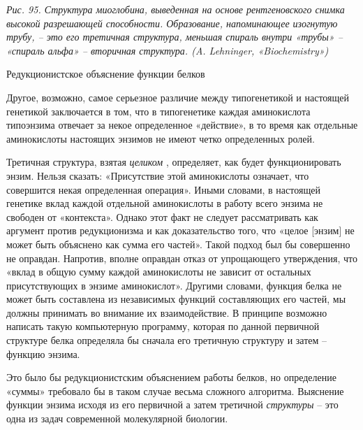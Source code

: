 \documentclass[../main.tex]{subfiles}
\begin{document}
\emph{Рис. 95. Структура миоглобина, выведенная на основе рентгеновского снимка высокой разрешающей способности. Образование, напоминающее изогнутую трубу, \--- это его третичная структура, меньшая спираль внутри «трубы» \--- «спираль альфа» \--- вторичная структура. (A. Lehninger, «Biochemistry»)}

Редукционистское объяснение функции белков

Другое, возможно, самое серьезное различие между типогенетикой и настоящей генетикой заключается в том, что в типогенетике каждая аминокислота типоэнзима отвечает за некое определенное «действие», в то время как отдельные аминокислоты настоящих энзимов не имеют четко определенных ролей.

Третичная структура, взятая \emph{целиком} , определяет, как будет функционировать энзим. Нельзя сказать: «Присутствие этой аминокислоты означает, что совершится некая определенная операция». Иными словами, в настоящей генетике вклад каждой отдельной аминокислоты в работу всего энзима не свободен от «контекста». Однако этот факт не следует рассматривать как аргумент против редукционизма и как доказательство того, что «целое {[}энзим{]} не может быть объяснено как сумма его частей». Такой подход был бы совершенно не оправдан. Напротив, вполне оправдан отказ от упрощающего утверждения, что «вклад в общую сумму каждой аминокислоты не зависит от остальных присутствующих в энзиме аминокислот». Другими словами, функция белка не может быть составлена из независимых функций составляющих его частей, мы должны принимать во внимание их взаимодействие. В принципе возможно написать такую компьютерную программу, которая по данной первичной структуре белка определяла бы сначала его третичную структуру и затем \--- функцию энзима.

Это было бы редукционистским объяснением работы белков, но определение «суммы» требовало бы в таком случае весьма сложного алгоритма. Выяснение функции энзима исходя из его первичной а затем третичной \emph{структуры} \--- это одна из задач современной молекулярной биологии.
\end{document}
